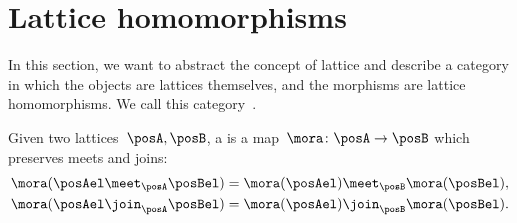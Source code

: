 \section{Lattice homomorphisms}
In this section, we want to abstract the concept of lattice and describe a category in which the objects are lattices themselves, and the morphisms are lattice homomorphisms.
We call this category~\Lat.

\begin{ctdefinition}
	\label{def:lattice_homomorphism}
	Given two lattices~$\posA, \posB$, a \emph{} is a map~$\mora\colon \posA\to \posB$ which preserves meets and joins:
	\begin{equation}
		\begin{aligned}
			\mora(\posAel \meet_\posA \posBel) & = \mora(\posAel) \meet_\posB \mora(\posBel), \\
			\mora(\posAel \join_\posA \posBel) & = \mora(\posAel) \join_\posB \mora(\posBel).
		\end{aligned}
	\end{equation}
\end{ctdefinition}

